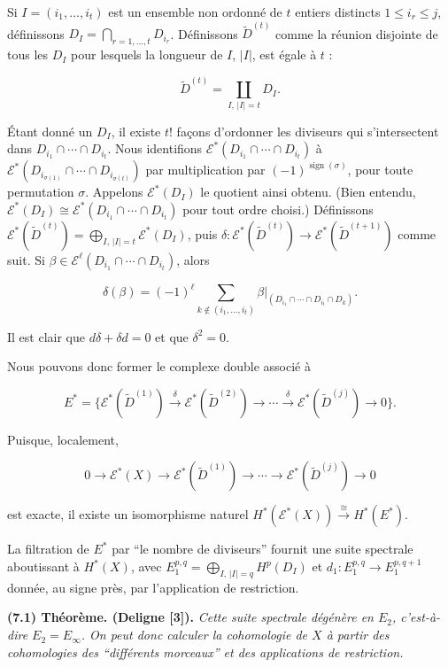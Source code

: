 \documentclass[
  french,
  a3paper,
  a3paper]{extarticle}
\begin{document}
Si \(I=(i_1,\ldots,i_t)\) est un ensemble non ordonné de \(t\) entiers
distincts \(1\leq i_r\leq j\), définissons
\(D_I=\bigcap_{r=1,\ldots,t}D_{i_r}\). Définissons
\(\widetilde D^{(t)}\) comme la réunion disjointe de tous les \(D_I\)
pour lesquels la longueur de \(I\), \(|I|\), est égale à \(t\) :

\[\widetilde D^{(t)}=\coprod_{I,\,|I|=t}D_I.\]

Étant donné un \(D_I\), il existe \(t!\) façons d'ordonner les diviseurs
qui s'intersectent dans \(D_{i_1}\cap\cdots\cap D_{i_t}\). Nous
identifions \(\mathcal E^*(D_{i_1}\cap\cdots\cap D_{i_t})\) à
\(\mathcal E^*(D_{i_{\sigma(1)}}\cap\cdots\cap D_{i_{\sigma(t)}})\) par
multiplication par \((-1)^{\operatorname{sign}(\sigma)}\), pour toute
permutation \(\sigma\). Appelons \(\mathcal E^*(D_I)\) le quotient ainsi
obtenu. (Bien entendu,
\(\mathcal E^*(D_I)\cong\mathcal E^*(D_{i_1}\cap\cdots\cap D_{i_t})\)
pour tout ordre choisi.) Définissons
\(\mathcal E^*(\widetilde D^{(t)})=\bigoplus_{I,\,|I|=t}\mathcal E^*(D_I)\),
puis
\(\delta:\mathcal E^*(\widetilde D^{(t)})\to\mathcal E^*(\widetilde D^{(t+1)})\)
comme suit. Si
\(\beta\in\mathcal E^{\ell}(D_{i_1}\cap\cdots\cap D_{i_t})\), alors

\[\delta(\beta)=(-1)^{\ell}\sum_{k\notin(i_1,\ldots,i_t)}\beta|_{(D_{i_1}\cap\cdots\cap D_{i_t}\cap D_k)}.\]

Il est clair que \(d\delta+\delta d=0\) et que \(\delta^2=0\).

Nous pouvons donc former le complexe double associé à

\[E^*=\{\mathcal E^*(\widetilde D^{(1)})\xrightarrow{\delta}\mathcal E^*(\widetilde D^{(2)})\longrightarrow\cdots\xrightarrow{\delta}\mathcal E^*(\widetilde D^{(j)})\longrightarrow0\}.\]

Puisque, localement,

\[0\longrightarrow\mathcal E^*(X)\longrightarrow\mathcal E^*(\widetilde D^{(1)})\longrightarrow\cdots\longrightarrow\mathcal E^*(\widetilde D^{(j)})\longrightarrow0\]

est exacte, il existe un isomorphisme naturel
\(H^*(\mathcal E^*(X))\xrightarrow{\cong}H^*(E^*)\).

La filtration de \(E^*\) par ``le nombre de diviseurs'' fournit une
suite spectrale aboutissant à \(H^*(X)\), avec
\(E_1^{p,q}=\bigoplus_{I,\,|I|=q}H^p(D_I)\) et
\(d_1:E_1^{p,q}\to E_1^{p,q+1}\) donnée, au signe près, par
l'application de restriction.

\textbf{(7.1) Théorème. (Deligne {[}3{]}).} \emph{Cette suite spectrale
dégénère en \(E_2\), c'est-à-dire \(E_2=E_\infty\). On peut donc
calculer la cohomologie de \(X\) à partir des cohomologies des
``différents morceaux'' et des applications de restriction.}
\end{document}
